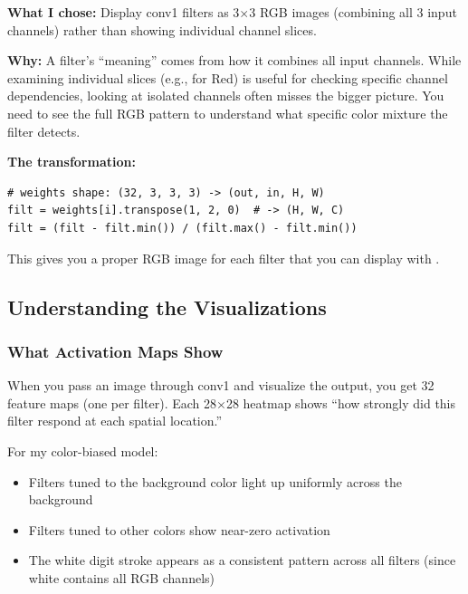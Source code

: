 \documentclass[9pt,a4paper,twocolumn,twoside]{tau-class/tau}
\begin{document}
        \begin{tauenv}[frametitle={Decision: Visualize Full RGB Filters, Not Individual Channels}]
            \textbf{What I chose:} Display conv1 filters as 3$\times$3 RGB images (combining all 3 input channels) rather than showing individual channel slices.

            \textbf{Why:} A filter's ``meaning'' comes from how it combines all input channels. While examining individual slices (e.g.,  for Red) is useful for checking specific channel dependencies, looking at isolated channels often misses the bigger picture. You need to see the full RGB pattern to understand what specific color mixture the filter detects.

            \textbf{The transformation:}
            \begin{verbatim}
# weights shape: (32, 3, 3, 3) -> (out, in, H, W)
filt = weights[i].transpose(1, 2, 0)  # -> (H, W, C)
filt = (filt - filt.min()) / (filt.max() - filt.min())
            \end{verbatim}

            This gives you a proper RGB image for each filter that you can display with .
        \end{tauenv}

    \subsection{Understanding the Visualizations}

        \subsubsection{What Activation Maps Show}

        When you pass an image through conv1 and visualize the output, you get 32 feature maps (one per filter). Each 28$\times$28 heatmap shows ``how strongly did this filter respond at each spatial location.''

        For my color-biased model:
        \begin{itemize}
            \item Filters tuned to the background color light up uniformly across the background
            \item Filters tuned to other colors show near-zero activation
            \item The white digit stroke appears as a consistent pattern across all filters (since white contains all RGB channels)
        \end{itemize}
\end{document}
